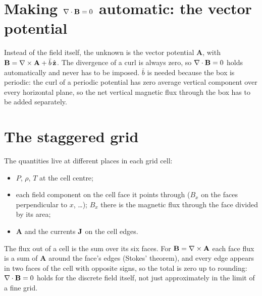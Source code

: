 \section{Making $\nabla\cdot\mathbf B=0$ automatic: the vector potential}
Instead of the field itself, the unknown is the vector potential $\mathbf A$, with $\mathbf B=\nabla\times\mathbf A+\bar b\,\hat{\mathbf z}$.
The divergence of a curl is always zero, so $\nabla\cdot\mathbf B=0$ holds automatically and never has to be imposed. $\bar b$
is needed because the box is periodic: the curl of a periodic potential has zero average vertical component over every
horizontal plane, so the net vertical magnetic flux through the box has to be added separately.

\section{The staggered grid}
\begin{minipage}[t]{0.57\linewidth}\vspace{0pt}
The quantities live at different places in each grid cell:
\begin{itemize}
\item $P$, $\rho$, $T$ at the cell centre;
\item each field component on the cell face it points through ($B_x$ on the faces perpendicular to $x$, \dots); $B_x$ there is
the magnetic flux through the face divided by its area;
\item $\mathbf A$ and the currents $\mathbf J$ on the cell edges.
\end{itemize}
The flux out of a cell is the sum over its six faces. For $\mathbf B=\nabla\times\mathbf A$ each face flux is a sum of $\mathbf A$
around the face's edges (Stokes' theorem), and every edge appears in two faces of the cell with opposite signs, so the total
is zero up to rounding: $\nabla\cdot\mathbf B=0$ holds for the discrete field itself, not just approximately in the limit of a fine
grid.
\end{minipage}\hfill
